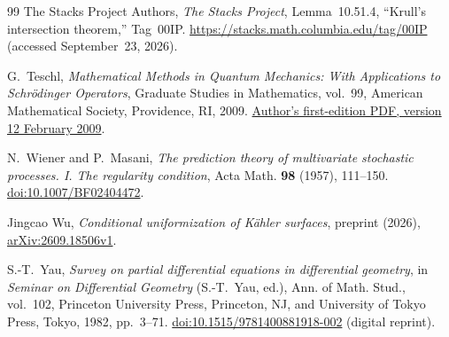 \documentclass[11pt]{article}
\theoremstyle{definition}
\theoremstyle{remark}
\numberwithin{equation}{section}
\begin{document}
\begin{thebibliography}{99}
The Stacks Project Authors,
\emph{The Stacks Project},
Lemma~10.51.4, ``Krull's intersection theorem,'' Tag~00IP.
\url{https://stacks.math.columbia.edu/tag/00IP}
(accessed September~23, 2026).

G.~Teschl,
\emph{Mathematical Methods in Quantum Mechanics:
With Applications to Schr\"odinger Operators},
Graduate Studies in Mathematics, vol.~99,
American Mathematical Society, Providence, RI, 2009.
\href{https://www.mat.univie.ac.at/~gerald/ftp/book-schroe/schroe.pdf}
{Author's first-edition PDF, version 12 February 2009}.

N.~Wiener and P.~Masani,
\emph{The prediction theory of multivariate stochastic processes.
I. The regularity condition},
Acta Math. \textbf{98} (1957), 111--150.
\href{https://doi.org/10.1007/BF02404472}{doi:10.1007/BF02404472}.

Jingcao Wu,
\emph{Conditional uniformization of K\"ahler surfaces},
preprint (2026),
\href{https://arxiv.org/abs/2609.18506v1}{arXiv:2609.18506v1}.

S.-T.~Yau,
\emph{Survey on partial differential equations in differential geometry},
in \emph{Seminar on Differential Geometry} (S.-T.~Yau, ed.),
Ann. of Math. Stud., vol.~102,
Princeton University Press, Princeton, NJ, and University of Tokyo Press,
Tokyo, 1982, pp.~3--71.
\href{https://doi.org/10.1515/9781400881918-002}
{doi:10.1515/9781400881918-002} (digital reprint).

\end{thebibliography}
\end{document}
